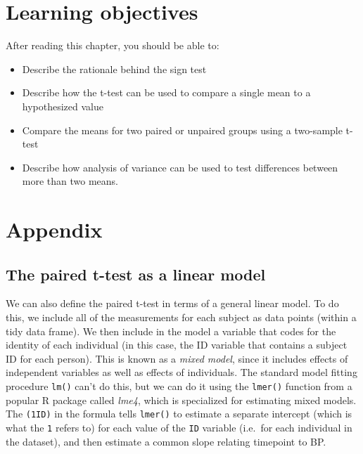\documentclass[12pt,]{book}
\providecommand{\tightlist}{%
  \setlength{\itemsep}{0pt}\setlength{\parskip}{0pt}}
\theoremstyle{definition}
\theoremstyle{definition}
\theoremstyle{definition}
\theoremstyle{remark}
\begin{document}
\hypertarget{learning-objectives-14}{%
\section{Learning objectives}\label{learning-objectives-14}}

After reading this chapter, you should be able to:

\begin{itemize}
\tightlist
\item
  Describe the rationale behind the sign test
\item
  Describe how the t-test can be used to compare a single mean to a hypothesized value
\item
  Compare the means for two paired or unpaired groups using a two-sample t-test
\item
  Describe how analysis of variance can be used to test differences between more than two means.
\end{itemize}

\hypertarget{appendix-6}{%
\section{Appendix}\label{appendix-6}}

\hypertarget{the-paired-t-test-as-a-linear-model}{%
\subsection{The paired t-test as a linear model}\label{the-paired-t-test-as-a-linear-model}}

We can also define the paired t-test in terms of a general linear model. To do this, we include all of the measurements for each subject as data points (within a tidy data frame). We then include in the model a variable that codes for the identity of each individual (in this case, the ID variable that contains a subject ID for each person). This is known as a \emph{mixed model}, since it includes effects of independent variables as well as effects of individuals. The standard model fitting procedure \texttt{lm()} can't do this, but we can do it using the \texttt{lmer()} function from a popular R package called \emph{lme4}, which is specialized for estimating mixed models. The \texttt{(1\textbar{}ID)} in the formula tells \texttt{lmer()} to estimate a separate intercept (which is what the \texttt{1} refers to) for each value of the \texttt{ID} variable (i.e.~for each individual in the dataset), and then estimate a common slope relating timepoint to BP.
\end{document}
